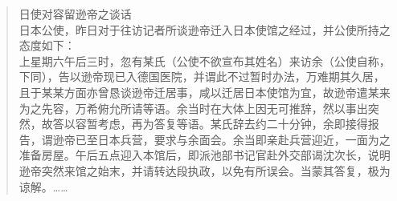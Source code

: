\begin{quote}
	日使对容留逊帝之谈话\\

日本公使，昨日对于往访记者所谈逊帝迁入日本使馆之经过，并公使所持之态度如下：\\

上星期六午后三时，忽有某氏（公使不欲宣布其姓名）来访余（公使自称，下同），告以逊帝现已入德国医院，并谓此不过暂时办法，万难期其久居，且于某某方面亦曾恳谈逊帝迁居事，咸以迁居日本使馆为宜，故逊帝遣某来为之先容，万希俯允所请等语。余当时在大体上因无可推辞，然以事出突然，故答以容暂考虑，再为答复等语。某氏辞去约二十分钟，余即接得报告，谓逊帝已至日本兵营，要求与余面会。余当即亲赴兵营迎近，一面为之准备房屋。午后五点迎入本馆后，即派池部书记官赴外交部谒沈次长，说明逊帝突然来馆之始末，并请转达段执政，以免有所误会。当蒙其答复，极为谅解。……\\
\end{quote}
